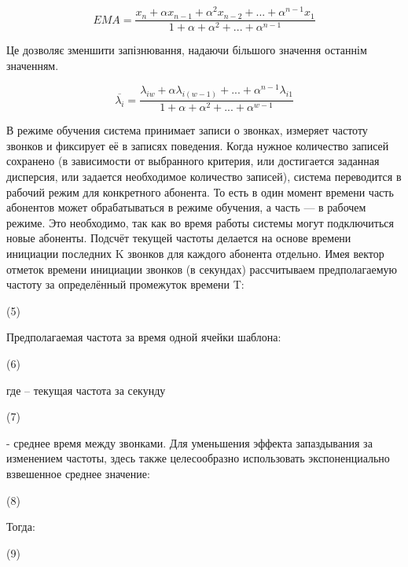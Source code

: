 \begin{equation}\label{eq:ema_nonrecursive}EMA = \frac{{x}_{n} + \alpha {x}_{n -1} + {\alpha} ^ {2} {x}_{n -2} +...+ {\alpha} ^ {n -1} {x}_{1}}{1+ \alpha + {\alpha} ^ {2} +...+ {\alpha} ^ {n -1}} \end{equation}

Це дозволяє зменшити запізнювання, надаючи більшого значення останнім значенням.

\begin{equation}\label{eq:ema_nonrecursive}\overline{{\lambda}_{i}} = \frac{{\lambda}_{i w} + \alpha {\lambda}_{i(w -1)} +...+ {\alpha} ^ {n -1} {\lambda}_{i1}}{1+ \alpha + {\alpha} ^ {2} +...+ {\alpha} ^ {w -1}} \end{equation}

В режиме обучения система принимает  записи о звонках, измеряет частоту звонков и фиксирует её в записях поведения. Когда нужное количество записей сохранено (в зависимости от выбранного критерия, или достигается заданная дисперсия, или задается необходимое количество записей), система переводится в рабочий режим для конкретного абонента. То есть в один момент времени часть абонентов может обрабатываться в режиме обучения, а часть — в рабочем режиме. Это необходимо, так как во время работы системы могут подключиться новые абоненты.
Подсчёт текущей частоты  делается на основе времени инициации последних K звонков для каждого абонента отдельно. Имея вектор  отметок времени инициации звонков (в секундах) рассчитываем предполагаемую частоту за определённый промежуток времени T: 

(5)

Предполагаемая частота за время одной ячейки шаблона:

(6)

где  – текущая частота за секунду

(7)

 - среднее время между звонками. Для уменьшения эффекта запаздывания за изменением частоты, здесь также целесообразно использовать  экспоненциально взвешенное среднее значение:

(8)

Тогда:

(9)

